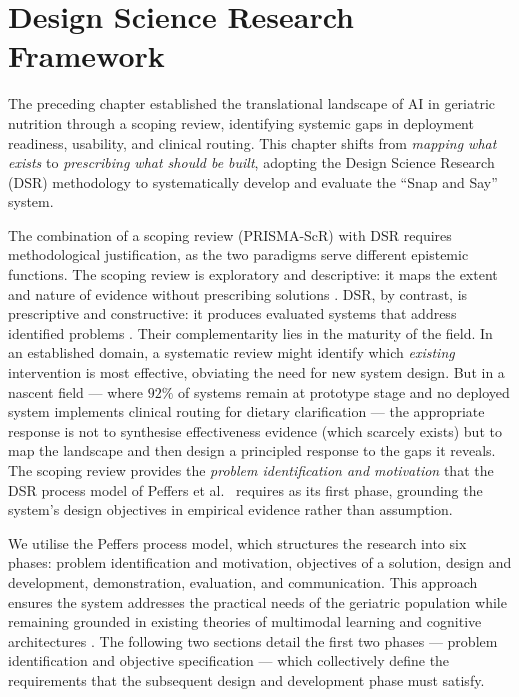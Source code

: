 \section{Design Science Research Framework}

The preceding chapter established the translational landscape of AI in geriatric nutrition through a scoping review, identifying systemic gaps in deployment readiness, usability, and clinical routing. This chapter shifts from \emph{mapping what exists} to \emph{prescribing what should be built}, adopting the Design Science Research (DSR) methodology to systematically develop and evaluate the ``Snap and Say'' system.

The combination of a scoping review (PRISMA-ScR) with DSR requires methodological justification, as the two paradigms serve different epistemic functions. The scoping review is exploratory and descriptive: it maps the extent and nature of evidence without prescribing solutions \citep{arkseyScopingStudiesMethodological2005}. DSR, by contrast, is prescriptive and constructive: it produces evaluated systems that address identified problems \citep{hevnerDesignScienceInformation2004}. Their complementarity lies in the maturity of the field. In an established domain, a systematic review might identify which \emph{existing} intervention is most effective, obviating the need for new system design. But in a nascent field --- where $92\%$ of systems remain at prototype stage and no deployed system implements clinical routing for dietary clarification --- the appropriate response is not to synthesise effectiveness evidence (which scarcely exists) but to map the landscape and then design a principled response to the gaps it reveals. The scoping review provides the \emph{problem identification and motivation} that the DSR process model of Peffers et al.\ \citep{peffersDesignScienceResearch2007} requires as its first phase, grounding the system's design objectives in empirical evidence rather than assumption.

We utilise the Peffers process model, which structures the research into six phases: problem identification and motivation, objectives of a solution, design and development, demonstration, evaluation, and communication. This approach ensures the system addresses the practical needs of the geriatric population while remaining grounded in existing theories of multimodal learning and cognitive architectures \citep{hevnerDesignScienceInformation2004}. The following two sections detail the first two phases --- problem identification and objective specification --- which collectively define the requirements that the subsequent design and development phase must satisfy.

